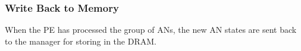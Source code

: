 \documentclass[journal]{IEEEtran}
\begin{document}

\subsubsection{Write Back to Memory}
\label{ssec:writingANStates}

When the PE has processed the group of ANs, the new AN states are sent back to the manager for storing in the DRAM. 

\end{document}
